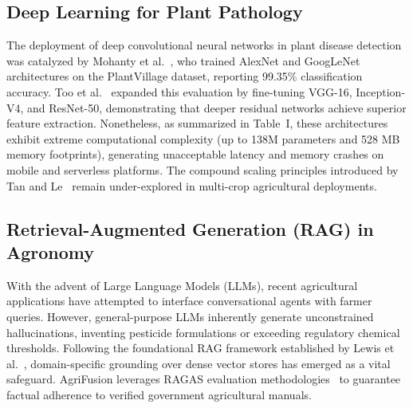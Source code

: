 \documentclass[conference]{IEEEtran}
\begin{document}
\subsection{Deep Learning for Plant Pathology}
The deployment of deep convolutional neural networks in plant disease detection was catalyzed by Mohanty et al.~\cite{mohanty2016using}, who trained AlexNet and GoogLeNet architectures on the PlantVillage dataset, reporting 99.35\% classification accuracy. Too et al.~\cite{too2019comparative} expanded this evaluation by fine-tuning VGG-16, Inception-V4, and ResNet-50, demonstrating that deeper residual networks achieve superior feature extraction. Nonetheless, as summarized in Table~I, these architectures exhibit extreme computational complexity (up to 138M parameters and 528 MB memory footprints), generating unacceptable latency and memory crashes on mobile and serverless platforms. The compound scaling principles introduced by Tan and Le~\cite{tan2019efficientnet} remain under-explored in multi-crop agricultural deployments.

\subsection{Retrieval-Augmented Generation (RAG) in Agronomy}
With the advent of Large Language Models (LLMs), recent agricultural applications have attempted to interface conversational agents with farmer queries. However, general-purpose LLMs inherently generate unconstrained hallucinations, inventing pesticide formulations or exceeding regulatory chemical thresholds. Following the foundational RAG framework established by Lewis et al.~\cite{lewis2020retrieval}, domain-specific grounding over dense vector stores has emerged as a vital safeguard. AgriFusion leverages RAGAS evaluation methodologies~\cite{espejel2024ragas} to guarantee factual adherence to verified government agricultural manuals.
\end{document}
